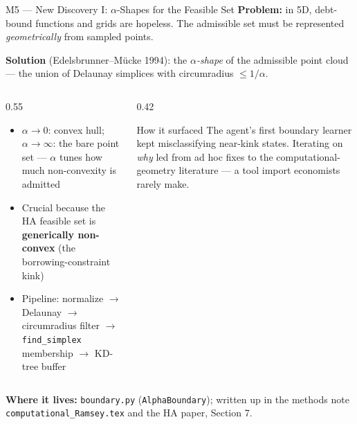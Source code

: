 \documentclass[10pt,aspectratio=169]{beamer}
\begin{document}
\begin{frame}{M5 --- New Discovery I: $\alpha$-Shapes for the Feasible Set}
\textbf{Problem:} in 5D, debt-bound functions and grids are hopeless. The admissible set must be represented \emph{geometrically} from sampled points.

\medskip
\textbf{Solution} (Edelsbrunner--M\"ucke 1994): the \emph{$\alpha$-shape} of the admissible point cloud ---
the union of Delaunay simplices with circumradius $\le 1/\alpha$.

\medskip
\begin{columns}[T]
\begin{column}{0.55\textwidth}
\begin{itemize}
    \item $\alpha \to 0$: convex hull; \; $\alpha \to \infty$: the bare point set ---
          $\alpha$ tunes how much non-convexity is admitted
    \item Crucial because the HA feasible set is \textbf{generically non-convex}
          (the borrowing-constraint kink)
    \item Pipeline: normalize $\to$ Delaunay $\to$ circumradius filter $\to$
          \texttt{find\_simplex} membership $\to$ KD-tree buffer
\end{itemize}
\end{column}
\begin{column}{0.42\textwidth}
\begin{exampleblock}{How it surfaced}
The agent's first boundary learner kept misclassifying
near-kink states. Iterating on \emph{why} led from ad hoc fixes to the computational-geometry
literature --- a tool import economists rarely make.
\end{exampleblock}
\end{column}
\end{columns}

\medskip
\textbf{Where it lives:} \texttt{boundary.py} (\texttt{AlphaBoundary}); written up in the methods
note \texttt{computational\_Ramsey.tex} and the HA paper, Section 7.
\end{frame}
\end{document}
